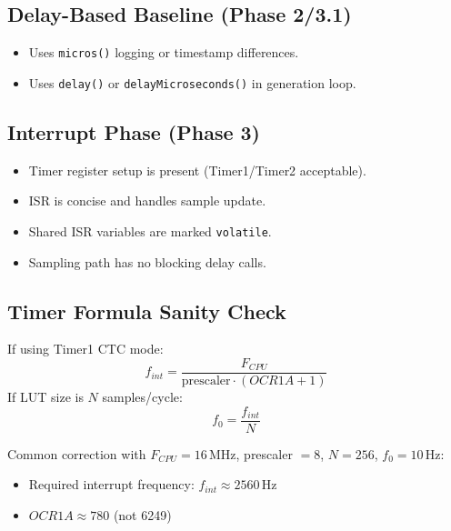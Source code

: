 \documentclass[11pt,letterpaper]{article}
\begin{document}
\subsection*{Delay-Based Baseline (Phase 2/3.1)}
\begin{itemize}[leftmargin=1.2em]
    \item Uses \texttt{micros()} logging or timestamp differences.
    \item Uses \texttt{delay()} or \texttt{delayMicroseconds()} in generation loop.
\end{itemize}

\subsection*{Interrupt Phase (Phase 3)}
\begin{itemize}[leftmargin=1.2em]
    \item Timer register setup is present (Timer1/Timer2 acceptable).
    \item ISR is concise and handles sample update.
    \item Shared ISR variables are marked \texttt{volatile}.
    \item Sampling path has no blocking delay calls.
\end{itemize}

\subsection*{Timer Formula Sanity Check}
If using Timer1 CTC mode:
\[
f_{int} = \frac{F_{CPU}}{\text{prescaler}\cdot(OCR1A+1)}
\]
If LUT size is $N$ samples/cycle:
\[
f_0 = \frac{f_{int}}{N}
\]

Common correction with $F_{CPU}=16\,\text{MHz}$, prescaler $=8$, $N=256$, $f_0=10\,\text{Hz}$:
\begin{itemize}[leftmargin=1.2em]
    \item Required interrupt frequency: $f_{int} \approx 2560\,\text{Hz}$
    \item $OCR1A \approx 780$ (not 6249)
\end{itemize}
\end{document}
